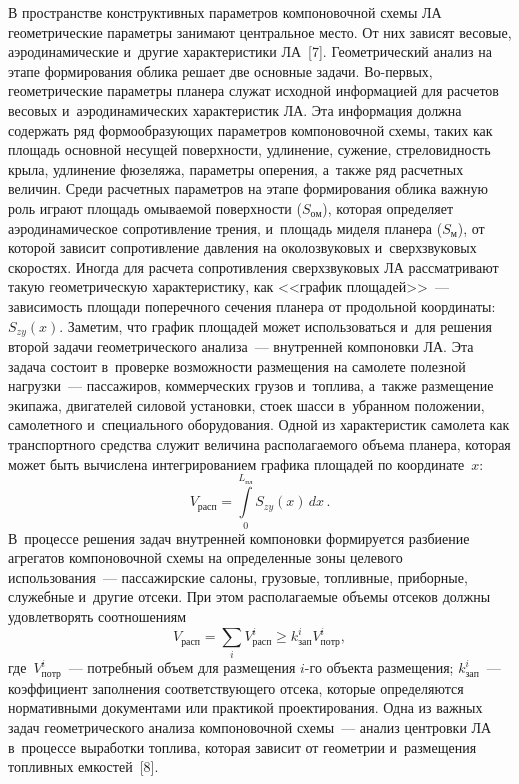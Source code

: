 \begin{multicols}{2}
  В пространстве конструктивных параметров компоновочной схемы ЛА 
геометрические па\-ра\-мет\-ры занимают цент\-раль\-ное мес\-то. От них зависят 
весовые, аэродинамические и~другие характеристики ЛА~[7]. Гео\-мет\-ри\-че\-ский 
анализ на этапе формирования облика решает две основные задачи.  
Во-пер\-вых, гео\-мет\-ри\-че\-ские па\-ра\-мет\-ры планера служат исходной 
информацией для расчетов весовых и~аэродинамических характеристик ЛА. 
Эта информация должна содержать ряд фор\-мо\-об\-ра\-зу\-ющих па\-ра\-мет\-ров 
компоновочной схемы, таких как площадь основной несущей по\-верх\-ности, 
удлинение, сужение, стреловидность крыла, удлинение фюзеляжа, па\-ра\-мет\-ры 
оперения, а~так\-же ряд расчетных величин. Среди расчетных па\-ра\-мет\-ров на 
этапе формирования облика важную роль играют площадь омываемой 
по\-верх\-ности ($S_{\mathrm{ом}}$), которая определяет аэродинамическое 
сопротивление трения, и~площадь миделя планера ($S_{\mathrm{м}}$), от 
которой зависит сопротивление дав\-ле\-ния на околозвуковых и~сверхзвуковых 
скоростях. Иногда для расчета сопротивления сверхзвуковых ЛА 
рассматривают такую гео\-мет\-ри\-че\-скую характеристику, как <<график 
площадей>>~--- за\-ви\-си\-мость площади поперечного сечения планера от 
продольной координаты: $S_{zy}(x)$. Заметим, что график площадей может 
использоваться и~для решения второй задачи гео\-мет\-ри\-че\-ско\-го анализа~--- 
внутренней компоновки ЛА. Эта задача состоит в~проверке воз\-мож\-ности 
размещения на самолете полезной нагрузки~--- пассажиров, коммерческих 
грузов и~топлива, а~так\-же размещение экипажа, двигателей силовой установки, 
стоек шасси в~убранном положении, самолетного и~специального 
оборудования. Одной из характеристик самолета как транспортного средства 
служит величина располагаемого объема планера, которая может быть 
вы\-чис\-ле\-на интегрированием графика площадей по координате~$x$: 
$$
V_{\mathrm{расп}}= \int\limits_0^{L_{\mathrm{пл}}} S_{zy}(x)\,dx\,.
$$ 
В~процессе решения задач внутренней компоновки формируется разбиение 
агрегатов компоновочной схемы на определенные зоны целевого 
использования~--- пассажирские салоны, грузовые, топ\-лив\-ные, приборные, 
служебные и~другие отсеки. При этом располагаемые объемы отсеков должны 
удовлетворять соотношениям  
$$
V_{\mathrm{расп}}= \sum\limits_i 
V^i_{\mathrm{расп}} \geq k^i_{\mathrm{зап}} V^i_{\mathrm{потр}},
$$
 где~$V^i_{\mathrm{потр}}$~--- по\-треб\-ный объем для размещения $i$-го объекта 
размещения; $ k^i_{\mathrm{зап}}$~--- коэффициент заполнения 
со\-от\-вет\-ст\-ву\-юще\-го отсека, которые определяются нормативными документами 
или практикой проектирования. Одна из важных задач гео\-мет\-ри\-че\-ско\-го анализа 
компоновочной схемы~--- анализ цент\-ров\-ки ЛА в~процессе выработки топ\-ли\-ва, 
которая зависит от гео\-мет\-рии и~размещения топ\-лив\-ных емкостей~[8]. 



\end{multicols}

